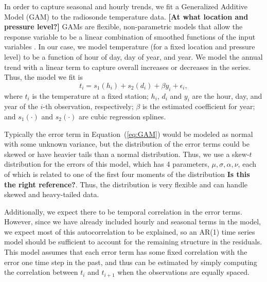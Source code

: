 \documentclass[12pt]{article}
\def\ni{\noindent}
\begin{document}
\begin{doublespacing}
In order to capture seasonal and hourly trends, we fit a Generalized Additive Model (GAM) to the radiosonde temperature data.  \textbf{[At what location and pressure level?]} GAMs are flexible, non-parametric models that allow the response variable to be a linear combination of smoothed functions of the input variables \cite{bell14}.  In our case, we model temperature (for a fixed location and pressure level) to be a function of hour of day, day of year, and year.  We model the annual trend with a linear term to capture overall increases or decreases in the series.  Thus, the model we fit is
\begin{equation} \label{eq:GAM}
	t_i = s_1(h_i) + s_2(d_i) + \beta y_i + \epsilon_i,
\end{equation}
\ni where $t_i$ is the temperature at a fixed station; $h_i$, $d_i$ and $y_i$ are the hour, day, and year of the $i$-th observation, respectively; $\beta$ is the estimated coefficient for year; and $s_1(\cdot)$ and $s_2(\cdot)$ are cubic regression splines.

Typically the error term in Equation~(\ref{eq:GAM}) would be modeled as normal with some unknown variance, but the distribution of the error terms could be skewed or have heavier tails than a normal distribution.  Thus, we use a skew-$t$ distribution for the errors of this model, which has 4 parameters, $\mu, \sigma, \alpha, \nu$, each of which is related to one of the first four moments of the distribution \cite{azzalini03} \textbf{Is this the right reference?}.  Thus, the distribution is very flexible and can handle skewed and heavy-tailed data.

Additionally, we expect there to be temporal correlation in the error terms.  However, since we have already included hourly and seasonal terms in the model, we expect most of this autocorrelation to be explained, so an AR(1) time series model should be sufficient to account for the remaining structure in the residuals.  This model assumes that each error term has some fixed correlation with the error one time step in the past, and thus can be estimated by simply computing the correlation between $t_i$ and $t_{i+1}$ when the observations are equally spaced.


\end{doublespacing}
\end{document}
